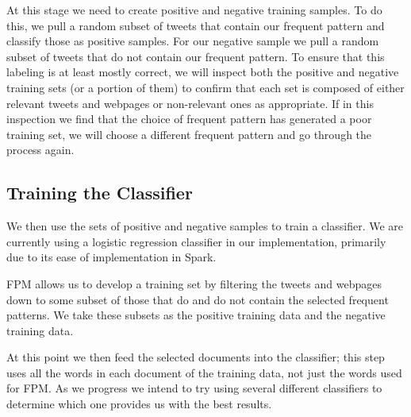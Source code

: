 At this stage we need to create positive and negative training samples. To do this, we pull a random subset of tweets that contain our frequent pattern and classify those as positive samples. For our negative sample we pull a random subset of tweets that do not contain our frequent pattern. To ensure that this labeling is at least mostly correct, we will inspect both the positive and negative training sets (or a portion of them) to confirm that each set is composed of either relevant tweets and webpages or non-relevant ones as appropriate. If in this inspection we find that the choice of frequent pattern has generated a poor training set, we will choose a different frequent pattern and go through the process again.


\subsection{Training the Classifier}

We then use the sets of positive and negative samples to train a classifier. We are currently using a logistic regression classifier in our implementation, primarily due to its ease of implementation in Spark.

FPM allows us to develop a training set by filtering the tweets and webpages down to some subset of those that do and do not contain the selected frequent patterns. We take these subsets as the positive training data and the negative training data.

At this point we then feed the selected documents into the classifier; this step uses all the words in each document of the training data, not just the words used for FPM. As we progress we intend to try using several different classifiers to determine which one provides us with the best results.


